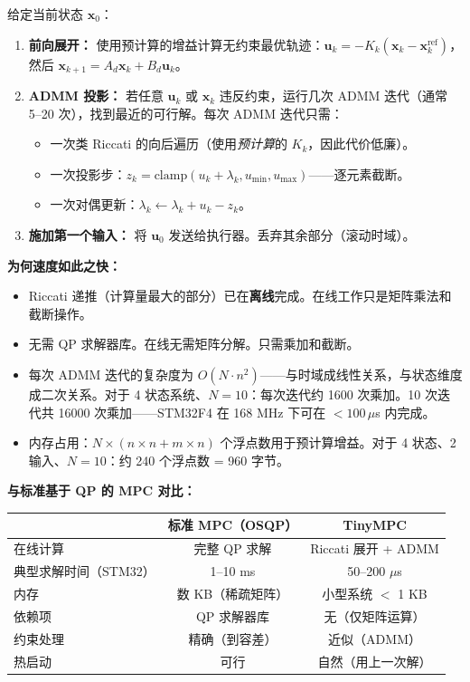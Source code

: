 给定当前状态 $\mathbf{x}_0$：
\begin{enumerate}
    \item \textbf{前向展开：} 使用预计算的增益计算无约束最优轨迹：$\mathbf{u}_k = -K_k (\mathbf{x}_k - \mathbf{x}_k^{\text{ref}})$，然后 $\mathbf{x}_{k+1} = A_d \mathbf{x}_k + B_d \mathbf{u}_k$。
    \item \textbf{ADMM 投影：} 若任意 $\mathbf{u}_k$ 或 $\mathbf{x}_k$ 违反约束，运行几次 ADMM 迭代（通常 5--20 次），找到最近的可行解。每次 ADMM 迭代只需：
    \begin{itemize}[nosep]
        \item 一次类 Riccati 的向后遍历（使用\textit{预计算}的 $K_k$，因此代价低廉）。
        \item 一次投影步：$z_k = \text{clamp}(u_k + \lambda_k, u_{\min}, u_{\max})$——逐元素截断。
        \item 一次对偶更新：$\lambda_k \leftarrow \lambda_k + u_k - z_k$。
    \end{itemize}
    \item \textbf{施加第一个输入：} 将 $\mathbf{u}_0$ 发送给执行器。丢弃其余部分（滚动时域）。
\end{enumerate}

\textbf{为何速度如此之快：}
\begin{itemize}
    \item Riccati 递推（计算量最大的部分）已在\textbf{离线}完成。在线工作只是矩阵乘法和截断操作。
    \item 无需 QP 求解器库。在线无需矩阵分解。只需乘加和截断。
    \item 每次 ADMM 迭代的复杂度为 $O(N \cdot n^2)$——与时域成线性关系，与状态维度成二次关系。对于 4 状态系统、$N = 10$：每次迭代约 1600 次乘加。10 次迭代共 16000 次乘加——STM32F4 在 168 MHz 下可在 $< 100\,\mu$s 内完成。
    \item 内存占用：$N \times (n \times n + m \times n)$ 个浮点数用于预计算增益。对于 4 状态、2 输入、$N = 10$：约 240 个浮点数 = 960 字节。
\end{itemize}

\textbf{与标准基于 QP 的 MPC 对比：}

\begin{center}
\begin{tabular}{lcc}
\toprule
 & \textbf{标准 MPC（OSQP）} & \textbf{TinyMPC} \\
\midrule
在线计算 & 完整 QP 求解 & Riccati 展开 + ADMM \\
典型求解时间（STM32） & 1--10 ms & 50--200 $\mu$s \\
内存 & 数 KB（稀疏矩阵） & 小型系统 $<$ 1 KB \\
依赖项 & QP 求解器库 & 无（仅矩阵运算） \\
约束处理 & 精确（到容差） & 近似（ADMM） \\
热启动 & 可行 & 自然（用上一次解） \\
\bottomrule
\end{tabular}
\end{center}

